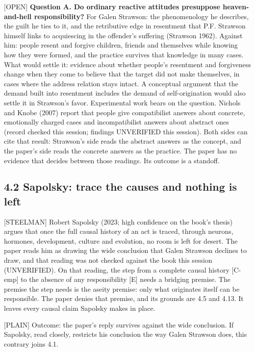 \documentclass[11pt]{article}
\newcommand{\register}[1]{{\ttfamily\small #1}}
\begin{document}
\register{[OPEN]} \textbf{Question A. Do ordinary reactive attitudes presuppose heaven-and-hell responsibility?} For Galen Strawson: the phenomenology he describes, the guilt he ties to it, and the retributive edge in resentment that P.F. Strawson himself links to acquiescing in the offender's suffering (Strawson 1962). Against him: people resent and forgive children, friends and themselves while knowing how they were formed, and the practice survives that knowledge in many cases. What would settle it: evidence about whether people's resentment and forgiveness change when they come to believe that the target did not make themselves, in cases where the address relation stays intact. A conceptual argument that the demand built into resentment includes the demand of self-origination would also settle it in Strawson's favor. Experimental work bears on the question. Nichols and Knobe (2007) report that people give compatibilist answers about concrete, emotionally charged cases and incompatibilist answers about abstract ones (record checked this session; findings UNVERIFIED this session). Both sides can cite that result: Strawson's side reads the abstract answers as the concept, and the paper's side reads the concrete answers as the practice. The paper has no evidence that decides between those readings. Its outcome is a standoff.

\subsection*{4.2 Sapolsky: trace the causes and nothing is left}

\register{[STEELMAN]} Robert Sapolsky (2023; high confidence on the book's thesis) argues that once the full causal history of an act is traced, through neurons, hormones, development, culture and evolution, no room is left for desert. The paper reads him as drawing the wide conclusion that Galen Strawson declines to draw, and that reading was not checked against the book this session (UNVERIFIED). On that reading, the step from a complete causal history [C-emp] to the absence of any responsibility [E] needs a bridging premise. The premise the step needs is the aseity premise: only what originates itself can be responsible. The paper denies that premise, and its grounds are 4.5 and 4.13. It leaves every causal claim Sapolsky makes in place.

\register{[PLAIN]} Outcome: the paper's reply survives against the wide conclusion. If Sapolsky, read closely, restricts his conclusion the way Galen Strawson does, this contrary joins 4.1.
\end{document}
